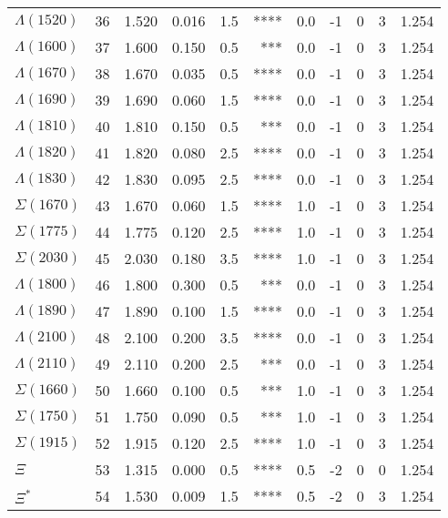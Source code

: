 \documentclass[a4paper,10pt]{article}
\begin{document}
\begin{tabular}{|lr|cccrccccc|}
$\Lambda(1520) $ &  36&  1.520&  0.016 &  1.5 &  ****&      0.0&      -1&       0&       3& 1.254\\
$\Lambda(1600) $ &  37&  1.600&  0.150 &  0.5 &   ***&      0.0&      -1&       0&       3& 1.254\\
$\Lambda(1670) $ &  38&  1.670&  0.035 &  0.5 &  ****&      0.0&      -1&       0&       3& 1.254\\
$\Lambda(1690) $ &  39&  1.690&  0.060 &  1.5 &  ****&      0.0&      -1&       0&       3& 1.254\\
$\Lambda(1810) $ &  40&  1.810&  0.150 &  0.5 &   ***&      0.0&      -1&       0&       3& 1.254\\
$\Lambda(1820) $ &  41&  1.820&  0.080 &  2.5 &  ****&      0.0&      -1&       0&       3& 1.254\\
$\Lambda(1830) $ &  42&  1.830&  0.095 &  2.5 &  ****&      0.0&      -1&       0&       3& 1.254\\
$\Sigma(1670)  $ &  43&  1.670&  0.060 &  1.5 &  ****&      1.0&      -1&       0&       3& 1.254\\
$\Sigma(1775)  $ &  44&  1.775&  0.120 &  2.5 &  ****&      1.0&      -1&       0&       3& 1.254\\
$\Sigma(2030)  $ &  45&  2.030&  0.180 &  3.5 &  ****&      1.0&      -1&       0&       3& 1.254\\
$\Lambda(1800) $ &  46&  1.800&  0.300 &  0.5 &   ***&      0.0&      -1&       0&       3& 1.254\\
$\Lambda(1890) $ &  47&  1.890&  0.100 &  1.5 &  ****&      0.0&      -1&       0&       3& 1.254\\
$\Lambda(2100) $ &  48&  2.100&  0.200 &  3.5 &  ****&      0.0&      -1&       0&       3& 1.254\\
$\Lambda(2110) $ &  49&  2.110&  0.200 &  2.5 &   ***&      0.0&      -1&       0&       3& 1.254\\
$\Sigma(1660)  $ &  50&  1.660&  0.100 &  0.5 &   ***&      1.0&      -1&       0&       3& 1.254\\
$\Sigma(1750)  $ &  51&  1.750&  0.090 &  0.5 &   ***&      1.0&      -1&       0&       3& 1.254\\
$\Sigma(1915)  $ &  52&  1.915&  0.120 &  2.5 &  ****&      1.0&      -1&       0&       3& 1.254\\
$\Xi           $ &  53&  1.315&  0.000 &  0.5 &  ****&      0.5&      -2&       0&       0& 1.254\\
$\Xi^*         $ &  54&  1.530&  0.009 &  1.5 &  ****&      0.5&      -2&       0&       3& 1.254\\

\end{tabular}
\end{document}
